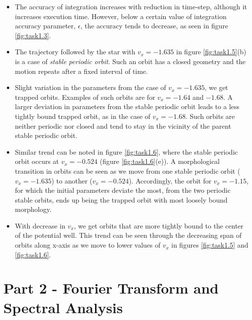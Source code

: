 \documentclass[a4paper]{article}
\begin{document}
		\begin{itemize}
			
			\item The accuracy of integration increases with reduction in time-step, although it increases execution time. However, below a certain value of integration accuracy parameter, \(\epsilon\), the accuracy tends to decrease, as seen in figure \ref{fig:task1.3}.
			
			\item The trajectory followed by the star with \(v_x = -1.635\) in figure \ref{fig:task1.5}(b) is a case of \emph{stable periodic orbit}. Such an orbit has a closed geometry and the motion repeats after a fixed interval of time.
			
			\item Slight variation in the parameters from the case of \(v_x = -1.635\), we get trapped orbits. Examples of such orbits are  for \(v_x = -1.64\) and \(-1.68\). A larger deviation in parameters from the stable periodic orbit leads to a less tightly bound trapped orbit, as in the case of \(v_x = -1.68\). Such orbits are neither periodic nor closed and tend to stay in the vicinity of the parent stable periodic orbit.
			
			\item Similar trend can be noted in figure \ref{fig:task1.6}, where the stable periodic orbit occurs at \(v_x = -0.524\) (figure \ref{fig:task1.6}(e)). A morphological transition in orbits can be seen as we move from one stable periodic orbit (\(v_x = -1.635\)) to another (\(v_x = -0.524\)). Accordingly, the orbit for \(v_x = -1.15\), for which the initial parameters deviate the most, from the two periodic stable orbits, ends up being the trapped orbit with most loosely bound morphology.
			
			\item With decrease in \(v_x\), we get orbits that are more tightly bound to the center of the potential well. This trend can be seen through the decreasing span of orbits along x-axis as we move to lower values of \(v_x\) in figures \ref{fig:task1.5} and \ref{fig:task1.6}. 
			
		\end{itemize}
		
	
	\clearpage
	\section{Part 2 - Fourier Transform and Spectral Analysis} \label{task2}
	
\end{document}
